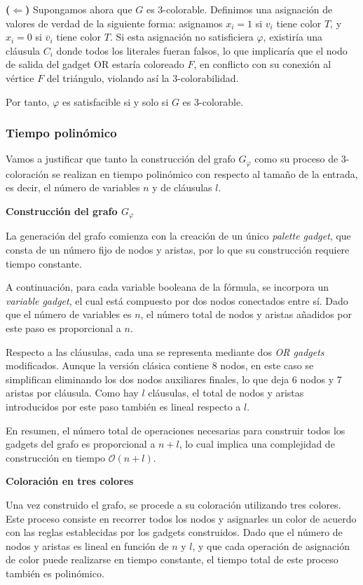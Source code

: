 \documentclass[a4paper,12pt]{article}
\begin{document}
\begin{itemize}
\textbf{(\( \Leftarrow \))} Supongamos ahora que \( G \) es 3-colorable.  
Definimos una asignación de valores de verdad de la siguiente forma: asignamos \( x_i = 1 \) si \( v_i \) tiene color \( T \), y \( x_i = 0 \) si \( \overline{v}_i \) tiene color \( T \).  
Si esta asignación no satisficiera \( \varphi \), existiría una cláusula \( C_i \) donde todos los literales fueran falsos, lo que implicaría que el nodo de salida del gadget OR estaría coloreado \( F \), en conflicto con su conexión al vértice \( F \) del triángulo, violando así la 3-colorabilidad.

Por tanto, \( \varphi \) es satisfacible si y solo si \( G \) es 3-colorable.
\subsubsection{Tiempo polinómico}

Vamos a justificar que tanto la construcción del grafo $G_\varphi$ como su proceso de 3-coloración se realizan en tiempo polinómico con respecto al tamaño de la entrada, es decir, el número de variables $n$ y de cláusulas $l$.

\textbf{Construcción del grafo $G_\varphi$}

La generación del grafo comienza con la creación de un único \emph{palette gadget}, que consta de un número fijo de nodos y aristas, por lo que su construcción requiere tiempo constante.

A continuación, para cada variable booleana de la fórmula, se incorpora un \emph{variable gadget}, el cual está compuesto por dos nodos conectados entre sí. Dado que el número de variables es $n$, el número total de nodos y aristas añadidos por este paso es proporcional a $n$.

Respecto a las cláusulas, cada una se representa mediante dos \emph{OR gadgets} modificados. Aunque la versión clásica contiene 8 nodos, en este caso se simplifican eliminando los dos nodos auxiliares finales, lo que deja 6 nodos y 7 aristas por cláusula. Como hay $l$ cláusulas, el total de nodos y aristas introducidos por este paso también es lineal respecto a $l$.

En resumen, el número total de operaciones necesarias para construir todos los gadgets del grafo es proporcional a $n + l$, lo cual implica una complejidad de construcción en tiempo $\mathcal{O}(n + l)$.

\textbf{Coloración en tres colores}

Una vez construido el grafo, se procede a su coloración utilizando tres colores. Este proceso consiste en recorrer todos los nodos y asignarles un color de acuerdo con las reglas establecidas por los gadgets construidos. Dado que el número de nodos y aristas es lineal en función de $n$ y $l$, y que cada operación de asignación de color puede realizarse en tiempo constante, el tiempo total de este proceso también es polinómico.


\end{itemize}
\end{document}

